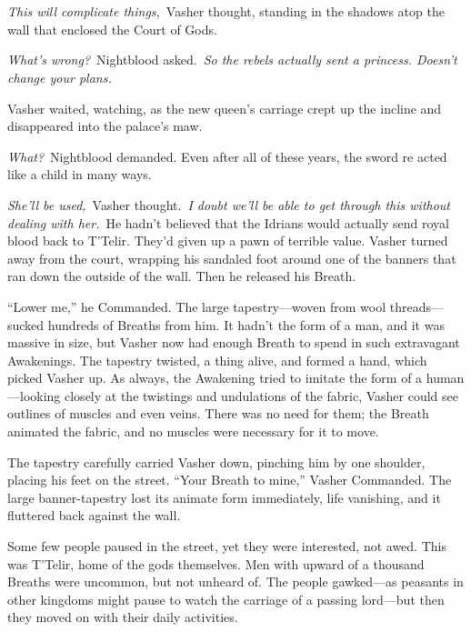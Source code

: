 \chapter{}

\textit{This will complicate things,}~Vasher thought, standing in the shadows atop the wall that enclosed the Court of Gods.

\textit{What’s wrong?}~Nightblood asked.~\textit{So the rebels actually sent a princess. Doesn’t change your plans.}

Vasher waited, watching, as the new queen’s carriage crept up the incline and disappeared into the palace’s maw.

\textit{What?}~Nightblood demanded. Even after all of these years, the sword re acted like a child in many ways.

\textit{She’ll be used,}~Vasher thought.~\textit{I doubt we’ll be able to get through this without dealing with her.}~He hadn’t believed that the Idrians would actually send royal blood back to T’Telir. They’d given up a pawn of terrible value. Vasher turned away from the court, wrapping his sandaled foot around one of the banners that ran down the outside of the wall. Then he released his Breath.

“Lower me,” he Commanded. The large tapestry—woven from wool threads—sucked hundreds of Breaths from him. It hadn’t the form of a man, and it was massive in size, but Vasher now had enough Breath to spend in such extravagant Awakenings. The tapestry twisted, a thing alive, and formed a hand, which picked Vasher up. As always, the Awakening tried to imitate the form of a human—looking closely at the twistings and undulations of the fabric, Vasher could see outlines of muscles and even veins. There was no need for them; the Breath animated the fabric, and no muscles were necessary for it to move.

The tapestry carefully carried Vasher down, pinching him by one shoulder, placing his feet on the street. “Your Breath to mine,” Vasher Commanded. The large banner-tapestry lost its animate form immediately, life vanishing, and it fluttered back against the wall.

Some few people paused in the street, yet they were interested, not awed. This was T’Telir, home of the gods themselves. Men with upward of a thousand Breaths were uncommon, but not unheard of. The people gawked—as peasants in other kingdoms might pause to watch the carriage of a passing lord—but then they moved on with their daily activities.

